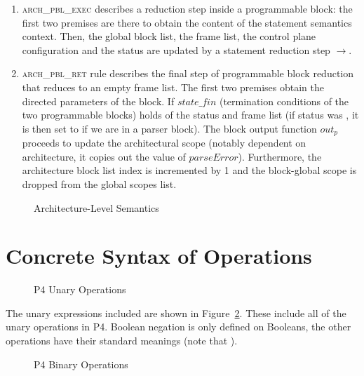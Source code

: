 \documentclass[UTF8]{article}
\begin{document}
\begin{enumerate}
\item \textsc{arch\_pbl\_exec} describes a reduction step inside a programmable block: the first two premises are there to obtain the content of the statement semantics context. Then, the global block list, the frame list, the control plane configuration and the status are updated by a statement reduction step $\longrightarrow$.

\item \textsc{arch\_pbl\_ret} rule describes the final step of programmable block reduction that reduces to an empty frame list. The first two premises obtain the directed parameters of the block. If $\mathit{state\_fin}$ (termination conditions of the two programmable blocks) holds of the status and frame list (if status was \running{}, it is then set to  if we are in a parser block). The block output function $\mathit{out}_{ \mathit{p} }$ proceeds to update the architectural scope (notably dependent on architecture, it copies out the value of $\mathit{parseError}$). Furthermore, the architecture block list index is incremented by 1 and the block-global scope is dropped from the global scopes list.
\end{enumerate}

\begin{figure}[ht!]
\resizebox{.8\linewidth}{!}{
\begin{minipage}{\linewidth}
\ottdefnsarchXXsem
\end{minipage}
}
\caption{Architecture-Level Semantics}
\label{fig:semarch}
\end{figure}


\clearpage
\appendix
\section{Concrete Syntax of Operations}
\label{app:op}
\begin{figure}[ht!]
\centering\ottgrammartabular{
\ottunop\ottafterlastrule
}
\caption{P4 Unary Operations}
\label{fig:unop}
\end{figure}

The unary expressions included are shown in Figure~\ref{fig:unop}. These include all of the unary operations in P4. Boolean negation is only defined on Booleans, the other operations have their standard meanings (note that ).

\newpage
\begin{figure}[ht!]
\centering\ottgrammartabular{
\ottbinop\ottafterlastrule
}
\caption{P4 Binary Operations}
\label{fig:binop}
\end{figure}
\end{document}
